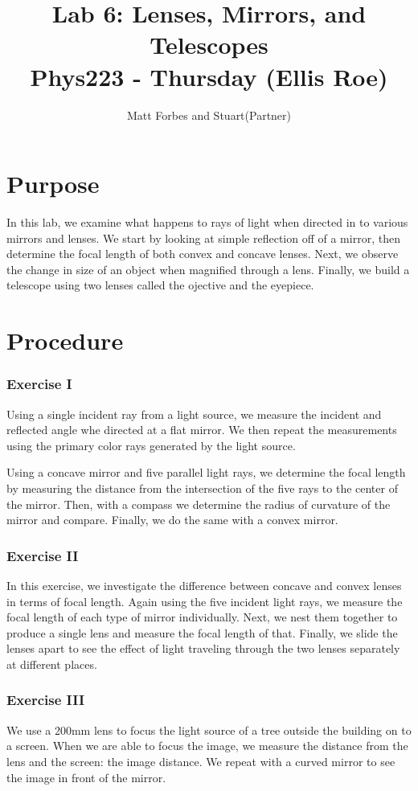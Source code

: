\documentclass[12pt]{article}
\def \TITLE {Lab 6: Lenses, Mirrors, and Telescopes\\ Phys223 - Thursday (Ellis Roe)}
\begin{document}
\onecolumn
\title{\TITLE}
\author{Matt Forbes and Stuart(Partner)}
\maketitle

\twocolumn
\section*{Purpose}
In this lab, we examine what happens to rays of light when directed in
to various mirrors and lenses. We start by looking at simple
reflection off of a mirror, then determine the focal length of both
convex and concave lenses. Next, we observe the change in size of an
object when magnified through a lens. Finally, we build a telescope
using two lenses called the ojective and the eyepiece.

\section*{Procedure}
\subsubsection*{Exercise I}
Using a single incident ray from a light source, we measure the
incident and reflected angle whe directed at a flat mirror. We then
repeat the measurements using the primary color rays generated by the
light source. 

Using a concave mirror and five parallel light rays, we determine the
focal length by measuring the distance from the intersection of the
five rays to the center of the mirror. Then, with a compass we
determine the radius of curvature of the mirror and compare. Finally,
we do the same with a convex mirror.

\subsubsection*{Exercise II}
In this exercise, we investigate the difference between concave and
convex lenses in terms of focal length. Again using the five incident
light rays, we measure the focal length of each type of mirror
individually. Next, we nest them together to produce a single lens and
measure the focal length of that. Finally, we slide the lenses apart
to see the effect of light traveling through the two lenses separately
at different places.

\subsubsection*{Exercise III}
We use a 200mm lens to focus the light source of a tree outside the
building on to a screen. When we are able to focus the image, we
measure the distance from the lens and the screen: the image
distance. We repeat with a curved mirror to see the image in front of
the mirror.
\end{document}
